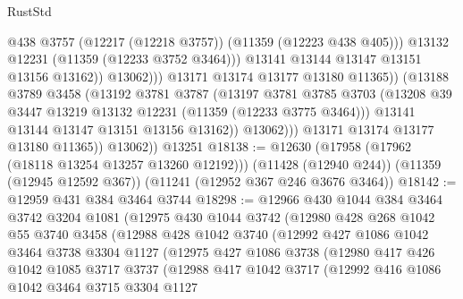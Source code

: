 \begin{lexlean}{RustStd}
\begin{coremodule}
{{{{{{{{{{{{{{{{{{{                                  @438
                                  @3757
                                  (@12217 (@12218 @3757))
                                  (@11359 (@12223 @438 @405)))
                                @13132
                                @12231
                                (@11359 (@12233 @3752 @3464)))
                              @13141
                              @13144
                              @13147
                              @13151
                              @13156
                              @13162))
                          @13062)))
                    @13171
                    @13174
                    @13177
                    @13180
                    @11365))
                (@13188
                  @3789
                  @3458
                  (@13192
                    @3781
                    @3787
                    (@13197
                      @3781
                      @3785
                      @3703
                      (@13208 @39 @3447 @13219 @13132 @12231 (@11359 (@12233 @3775 @3464)))
                      @13141
                      @13144
                      @13147
                      @13151
                      @13156
                      @13162))
                  @13062)))
            @13171
            @13174
            @13177
            @13180
            @11365))
        @13062))
    @13251
@18138 := @12630
    (@17958 (@17962 (@18118 @13254 @13257 @13260 @12192)))
    (@11428 (@12940 @244))
    (@11359 (@12945 @12592 @367))
    (@11241 (@12952 @367 @246 @3676 @3464))
@18142 := @12959 @431 @384 @3464 @3744
@18298 := @12966
    @430
    @1044
    @384
    @3464
    @3742
    @3204
    @1081
    (@12975
      @430
      @1044
      @3742
      (@12980
        @428
        @268
        @1042
        @55
        @3740
        @3458
        (@12988
          @428
          @1042
          @3740
          (@12992
            @427
            @1086
            @1042
            @3464
            @3738
            @3304
            @1127
            (@12975
              @427
              @1086
              @3738
              (@12980
                @417
                @426
                @1042
                @1085
                @3717
                @3737
                (@12988
                  @417
                  @1042
                  @3717
                  (@12992
                    @416
                    @1086
                    @1042
                    @3464
                    @3715
                    @3304
                    @1127
}}}}}}}}}}}}}}}}}}}
\end{coremodule}
\end{lexlean}
